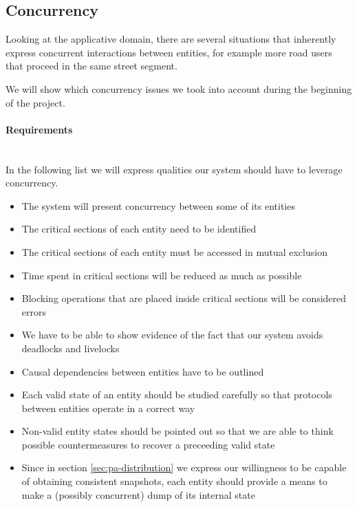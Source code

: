 \subsection{Concurrency}\label{sec:pa-concurrency}
Looking at the applicative domain, there are several situations that inherently
express concurrent interactions between entities, for example more road users
that proceed in the same street segment.

We will show which concurrency issues we took into account during the beginning
of the project.

\paragraph{Requirements} \mbox{} \\

In the following list we will express qualities our system should have to
leverage concurrency.

\begin{itemize}
\item The system will present concurrency between some of its entities
\item The critical sections of each entity need to be identified
\item The critical sections of each entity  must be accessed in mutual
  exclusion
\item Time spent in critical sections will be reduced as much as possible
\item Blocking operations that are placed inside critical sections will be
  considered errors
\item We have to be able to show evidence of the fact that our system avoids
  deadlocks and livelocks
\item Causal dependencies between entities have to be outlined
\item Each valid state of an entity should be studied carefully so that
  protocols between entities operate in a correct way
\item Non-valid entity states should be pointed out so that we are able to
  think possible countermeasures to recover a preceeding valid state
\item Since in section \ref{sec:pa-distribution} we express our willingness to
  be capable of obtaining consistent snapshots, each entity should provide a
  means to make a (possibly concurrent) dump of its internal state
\end{itemize}

